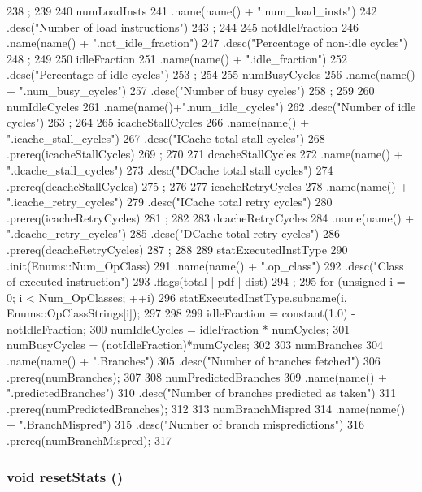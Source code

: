 \begin{DoxyCode}
{238         ;
239 
240     numLoadInsts
241         .name(name() + ".num_load_insts")
242         .desc("Number of load instructions")
243         ;
244 
245     notIdleFraction
246         .name(name() + ".not_idle_fraction")
247         .desc("Percentage of non-idle cycles")
248         ;
249 
250     idleFraction
251         .name(name() + ".idle_fraction")
252         .desc("Percentage of idle cycles")
253         ;
254 
255     numBusyCycles
256         .name(name() + ".num_busy_cycles")
257         .desc("Number of busy cycles")
258         ;
259 
260     numIdleCycles
261         .name(name()+".num_idle_cycles")
262         .desc("Number of idle cycles")
263         ;
264 
265     icacheStallCycles
266         .name(name() + ".icache_stall_cycles")
267         .desc("ICache total stall cycles")
268         .prereq(icacheStallCycles)
269         ;
270 
271     dcacheStallCycles
272         .name(name() + ".dcache_stall_cycles")
273         .desc("DCache total stall cycles")
274         .prereq(dcacheStallCycles)
275         ;
276 
277     icacheRetryCycles
278         .name(name() + ".icache_retry_cycles")
279         .desc("ICache total retry cycles")
280         .prereq(icacheRetryCycles)
281         ;
282 
283     dcacheRetryCycles
284         .name(name() + ".dcache_retry_cycles")
285         .desc("DCache total retry cycles")
286         .prereq(dcacheRetryCycles)
287         ;
288 
289     statExecutedInstType
290         .init(Enums::Num_OpClass)
291         .name(name() + ".op_class")
292         .desc("Class of executed instruction")
293         .flags(total | pdf | dist)
294         ;
295     for (unsigned i = 0; i < Num_OpClasses; ++i) {
296         statExecutedInstType.subname(i, Enums::OpClassStrings[i]);
297     }
298 
299     idleFraction = constant(1.0) - notIdleFraction;
300     numIdleCycles = idleFraction * numCycles;
301     numBusyCycles = (notIdleFraction)*numCycles;
302 
303     numBranches
304         .name(name() + ".Branches")
305         .desc("Number of branches fetched")
306         .prereq(numBranches);
307 
308     numPredictedBranches
309         .name(name() + ".predictedBranches")
310         .desc("Number of branches predicted as taken")
311         .prereq(numPredictedBranches);
312 
313     numBranchMispred
314         .name(name() + ".BranchMispred")
315         .desc("Number of branch mispredictions")
316         .prereq(numBranchMispred);
317 }
\end{DoxyCode}
\hypertarget{classBaseSimpleCPU_a65880e61108132689a1bd769b9187fb7}{
\subsubsection[{resetStats}]{\setlength{\rightskip}{0pt plus 5cm}void resetStats ()}}
\label{classBaseSimpleCPU_a65880e61108132689a1bd769b9187fb7}



